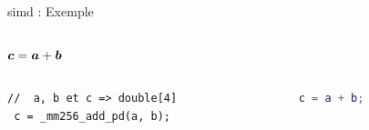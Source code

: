 \documentclass[../main.tex]{subfiles}
\begin{document}
\begin{frame}[fragile]{\acrshort{simd} : Exemple}
\begin{columns}
\begin{column}{.45\linewidth}
\begin{overlayarea}{\linewidth}{.4\textheight}
        $\bm{c} = \bm{a} + \bm{b}$ \\
        \phantom{$c_x$}

        \begin{columns}
          \begin{column}{.5\linewidth}
          \begin{lstlisting}[title={SIMD en C (Intel, double)},style=cstyle,basicstyle=\tiny]
 //  a, b et c => double[4]
 c = _mm256_add_pd(a, b);\end{lstlisting}
          \end{column}
          \begin{column}{.5\linewidth}
            \begin{lstlisting}[title={SIMD en MATLAB},style=cstyle,language=MATLAB,basicstyle=\tiny]
% a, b, et c => size = (1, 4)
c = a + b;\end{lstlisting}
          \end{column}
        \end{columns}
      \end{overlayarea}
    \end{column}
  \end{columns}
\end{frame}
\end{document}
